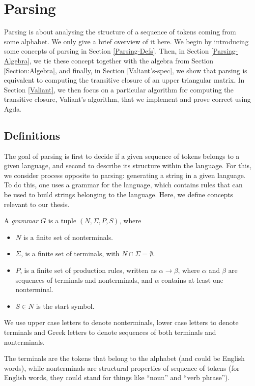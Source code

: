 \newcommand{\productions}{P}
\newcommand{\nonterminals}{N}
\newcommand{\terminals}{\Sigma}
\newcommand{\startsymbol}{S}
\newcommand{\grammar}{(\nonterminals, \terminals, \productions, \startsymbol)}
\chapter{Parsing}
\label{Parsing}
Parsing is about analysing the structure of a sequence of tokens coming from some alphabet. We only give a brief overview of it here.
We begin by introducing some concepts of parsing in Section \ref{Parsing-Defs}. Then, in Section \ref{Parsing-Algebra}, we tie these concept together with the algebra from Section \ref{Section:Algebra}, and finally, in Section \ref{Valiant's-spec}, we show that parsing is equivalent to computing the transitive closure of an upper triangular matrix.
In Section \ref{Valiant}, we then focus on a particular algorithm for computing the transitive closure, Valiant's algorithm, that we implement and prove correct using Agda.

\section{Definitions}
The goal of parsing is first to decide if a given sequence of tokens belongs to a given language, and second to describe its structure within the language.
For this, we consider process opposite to parsing: generating a string in a given language. To do this, one uses a grammar for the language, which contains rules that can be used to build strings belonging to the language.
\label{Parsing-Defs}
Here, we define concepts relevant to our thesis.
\begin{Definition}
  A \emph{grammar} $G$ is a tuple $\grammar$, where 
  \begin{itemize}
  \item $\nonterminals$ is a finite set of nonterminals.
  \item $\terminals$, is a finite set of terminals, with $\nonterminals \cap \terminals = \emptyset$.
  \item $\productions$, is a finite set of production rules, written as $\alpha \to \beta$, where $\alpha$ and $\beta$ are sequences of terminals and nonterminals, and $\alpha$ contains at least one nonterminal.
  \item $\startsymbol \in \nonterminals$ is the start symbol.
  \end{itemize}
  We use upper case letters to denote nonterminals, lower case letters to denote terminals and Greek letters to denote sequences of both terminals and nonterminals.
\end{Definition}
The terminals are the tokens that belong to the alphabet (and could be English words), while nonterminals are structural properties of sequence of tokens (for English words, they could stand for things like ``noun'' and ``verb phrase'').

